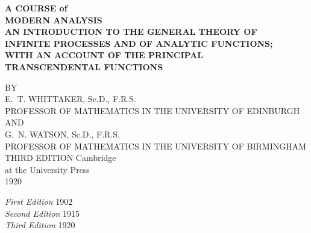 \begin{center}
\bfseries
\LARGE A COURSE of\\[12pt]
\Huge MODERN ANALYSIS\\[12pt]
\normalsize AN INTRODUCTION TO THE GENERAL THEORY OF\\
\normalsize INFINITE PROCESSES AND OF ANALYTIC FUNCTIONS;\\
\normalsize WITH AN ACCOUNT OF THE PRINCIPAL\\
\normalsize TRANSCENDENTAL FUNCTIONS

\par
\vfil

\normalfont
\normalsize BY \\
\bigskip
\Large E.~T. WHITTAKER, Sc.D., F.R.S.\\
\footnotesize PROFESSOR OF MATHEMATICS IN THE UNIVERSITY OF EDINBURGH\\
\bigskip
\footnotesize AND\\
\bigskip
\Large G.~N. WATSON, Sc.D., F.R.S.\\
\footnotesize PROFESSOR OF MATHEMATICS IN THE UNIVERSITY OF BIRMINGHAM
\vfil\vfil
\textsf{THIRD EDITION}
\vfil\vfil\vfil
\Large Cambridge \\
at the University Press \\
1920
\end{center}
\clearpage




\null\vfill
\begin{center}
\textit{First Edition} 1902 \\
\textit{Second Edition} 1915 \\
\textit{Third Edition} 1920
\end{center}
\vfill\clearpage